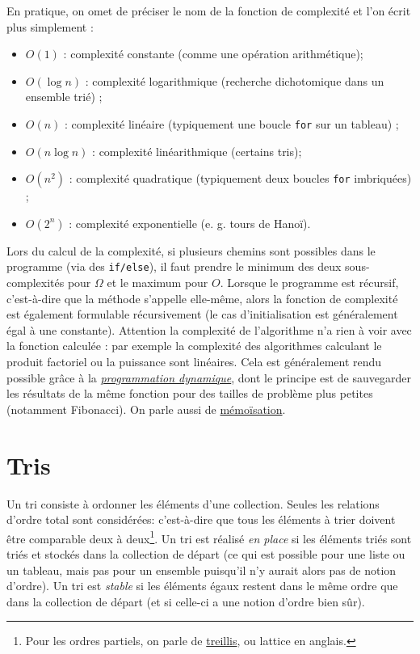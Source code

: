 \documentclass[10pt]{article}
\begin{document}
En pratique, on omet de préciser le nom de la fonction de complexité et l'on écrit plus simplement :
\begin{itemize}
\item $O(1)$ : complexité constante (comme une opération arithmétique);
\item $O(\log n)$ : complexité logarithmique (recherche dichotomique dans un ensemble trié) ;
\item $O(n)$ : complexité linéaire (typiquement une boucle \texttt{for} sur un tableau) ;
\item $O(n \log n)$ : complexité linéarithmique (certains tris);
\item $O(n^2)$ : complexité quadratique (typiquement deux boucles \texttt{for} imbriquées) ;
\item $O(2^n)$ : complexité exponentielle (e. g. tours de Hanoï).
\end{itemize}

Lors du calcul de la complexité, si plusieurs chemins sont possibles dans le programme (via des \texttt{if/else}), il faut prendre
le minimum des deux sous-complexités pour $\Omega$ et le maximum pour $O$. Lorsque le programme est récursif, c'est-à-dire que la
méthode s'appelle elle-même, alors la fonction de complexité est également formulable récursivement (le cas d'initialisation
est généralement égal à une constante). Attention la complexité de l'algorithme n'a rien à voir avec la fonction calculée : par exemple
la complexité des algorithmes calculant le produit factoriel ou la puissance sont linéaires. Cela est généralement rendu possible grâce à la
\href{https://fr.wikipedia.org/wiki/Programmation_dynamique}{\emph{programmation dynamique}},
dont le principe est de sauvegarder les résultats de la même fonction pour des tailles de problème
plus petites (notamment Fibonacci). On parle aussi de \href{https://fr.wikipedia.org/wiki/M\%C3\%A9mo\%C3\%AFsation}{mémoïsation}.

\section{Tris}

Un tri consiste à ordonner les éléments d'une collection. Seules les relations d'ordre total sont considérées: c'est-à-dire
que tous les éléments à trier doivent être comparable deux à deux\footnote{Pour les ordres partiels, on parle de
\href{https://fr.wikipedia.org/wiki/Treillis_(ensemble_ordonn\%C3\%A9)}{treillis}, ou lattice en anglais.}.
Un tri est réalisé \emph{en place} si les éléments triés sont triés et stockés dans la collection de départ
(ce qui est possible pour une liste ou un tableau,
mais pas pour un ensemble puisqu'il n'y aurait alors pas de notion d'ordre).
Un tri est \emph{stable} si les éléments égaux restent dans le même ordre que dans la collection de départ (et si celle-ci
a une notion d'ordre bien sûr).
\end{document}

